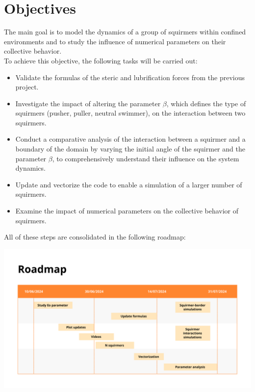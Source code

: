 \documentclass{article}
\begin{document}
\section{Objectives}
The main goal is to model the dynamics of a group of squirmers within confined environments and to
 study the influence of numerical parameters on their collective behavior.\\
 To achieve this objective, the following tasks will be carried out:
 \begin{itemize}
     \item Validate the formulas of the steric and lubrification forces from the previous project.
     \item Investigate the impact of altering the parameter $\beta$, which defines the
    type of squirmers (pusher, puller, neutral swimmer), on the interaction between two squirmers.
     \item Conduct a comparative analysis of the interaction between a squirmer and a 
    boundary of the domain by varying the initial angle of the squirmer and the parameter $\beta$, 
    to comprehensively understand their influence on the system dynamics.
     \item Update and vectorize the code to enable a simulation of a larger number of squirmers.
     \item Examine the impact of numerical parameters on the collective behavior of squirmers.
\end{itemize}
All of these steps are consolidated in the following roadmap:
\begin{center}
    \includegraphics[width=1.2\textwidth]{Presentation/images/roadmap_stage.png}
\end{center}

\newpage
\end{document}
